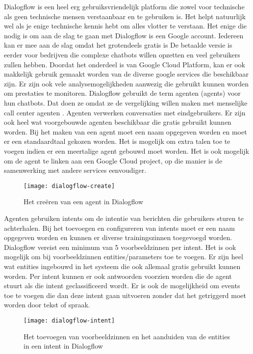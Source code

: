 Dialogflow is een heel erg gebruiksvriendelijk platform die zowel voor technische als geen technische mensen verstaanbaar en te gebruiken is. Het helpt natuurlijk wel als je enige technische kennis hebt om alles vlotter te verstaan. Het enige die nodig is om aan de slag te gaan met Dialogflow is een Google account. Iedereen kan er mee aan de slag omdat het grotendeels gratis is De betaalde versie is eerder voor bedrijven die complexe chatbots willen opzetten en veel gebruikers zullen hebben. Doordat het onderdeel is van Google Cloud Platform, kan er ook makkelijk gebruik gemaakt worden van de diverse google services die beschikbaar zijn. Er zijn ook vele analysemogelijkheden aanwezig die gebruikt kunnen worden om prestaties te monitoren. Dialogflow gebruikt de term agenten (agents) voor hun chatbots. Dat doen ze omdat ze de vergelijking willen maken met menselijke call center agenten \autocite{GoogleCloud2020}. Agenten verwerken conversaties met eindgebruikers. Er zijn ook heel wat voorgebouwde agenten beschikbaar die gratis gebruikt kunnen worden. Bij het maken van een agent moet een naam opgegeven worden en moet er een standaardtaal gekozen worden. Het is mogelijk om extra talen toe te voegen indien er een meertalige agent gebouwd moet worden. Het is ook mogelijk om de agent te linken aan een Google Cloud project, op die manier is de samenwerking met andere services eenvoudiger. 

\begin{figure}[H]
    \label{fig:dialogflow-create}
    \centering
    \texttt{[image: dialogflow-create]}
    \caption{Het creëren van een agent in Dialogflow}
\end{figure}

Agenten gebruiken intents om de intentie van berichten die gebruikers sturen te achterhalen. Bij het toevoegen en configureren van intents moet er een naam opgegeven worden en kunnen er diverse trainingszinnen toegevoegd worden. Dialogflow vereist een minimum van 5 voorbeeldzinnen per intent. Het is ook mogelijk om bij voorbeeldzinnen entities/parameters toe te voegen. Er zijn heel wat entities ingebouwd in het systeem die ook allemaal gratis gebruikt kunnen worden. Per intent kunnen er ook antwoorden voorzien worden die de agent stuurt als die intent geclassificeerd wordt. Er is ook de mogelijkheid om events toe te voegen die dan deze intent gaan uitvoeren zonder dat het getriggerd moet worden door tekst of spraak.

\begin{figure}[H]
    \label{fig:dialogflow-intent}
    \centering
    \texttt{[image: dialogflow-intent]}
    \caption{Het toevoegen van voorbeeldzinnen en het aanduiden van de entities in een intent in Dialogflow}
\end{figure}

